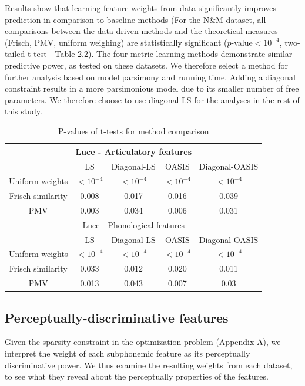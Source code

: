 Results show that learning feature weights from data significantly improves prediction in comparison to baseline methods (For the N\&M dataset, all comparisons between the data-driven methods and the theoretical measures (Frisch, PMV, uniform weighing) are statistically significant ($p$-value$<10^{-4}$, two-tailed t-test - Table 2.2). The four metric-learning methods demonstrate similar predictive power, as tested on these datasets. We therefore select a method for further analysis based on model parsimony and running time. Adding a diagonal constraint results in a more parsimonious model due to its smaller number of free parameters. We therefore choose to use diagonal-LS for the analyses in the rest of this study.

\begin{table}[H]
    \centering
    \begin{tabular}{|c|c|c|c|c|}
        \hline
        \multicolumn{5}{|c|}{Luce - Articulatory features}\\
        \hline
         & LS & Diagonal-LS & OASIS & Diagonal-OASIS \\
         \hline
         Uniform weights & $<10^{-4}$ & $<10^{-4}$ & $<10^{-4}$ & $<10^{-4}$ \\
         Frisch similarity & 0.008 &    0.017 &    0.016 &    0.039 \\
         PMV & 0.003 &    0.034 &    0.006 &    0.031 \\
         \hline
         \multicolumn{5}{|c|}{Luce - Phonological features}\\
         \hline
         & LS & Diagonal-LS & OASIS & Diagonal-OASIS \\
         \hline
         Uniform weights & $<10^{-4}$ &  $<10^{-4}$ & $<10^{-4}$ & $<10^{-4}$ \\
         Frisch similarity & 0.033 &    0.012 &    0.020 &    0.011 \\
         PMV & 0.013 &    0.043 &    0.007 &    0.03 \\
         \hline
         
    \end{tabular}
    \caption{P-values of t-tests for method comparison}
\end{table}


\subsection{Perceptually-discriminative features}
Given the sparsity constraint in the optimization problem (Appendix A), we interpret the weight of each subphonemic feature as its perceptually discriminative power. We thus examine the resulting weights from each dataset, to see what they reveal about the perceptually properties of the features.

